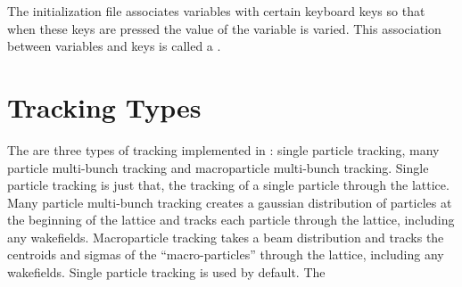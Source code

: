 The  initialization file associates variables with
certain keyboard keys so that when these keys are pressed the value of
the variable is varied. This association between variables and keys is
called a .

\section{Tracking Types}

The are three types of tracking implemented in \tao: single particle
tracking, many particle multi-bunch tracking and macroparticle
multi-bunch tracking. Single particle tracking is just that, the
tracking of a single particle through the lattice. Many particle
multi-bunch tracking creates a gaussian distribution of particles at
the beginning of the lattice and tracks each particle through the
lattice, including any wakefields. Macroparticle tracking takes a beam
distribution and tracks the centroids and sigmas of the
``macro-particles'' through the lattice, including any wakefields.
Single particle tracking is used by default. The
